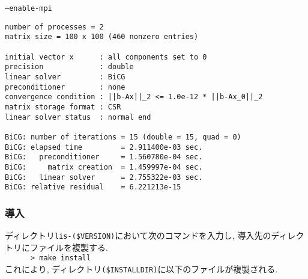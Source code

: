 \documentclass[a4paper]{jarticle}
\begin{document}
\begin{itembox}[l] {\tt --enable-mpi}
 \begin{minipage}{10cm}
 \begin{verbatim}
number of processes = 2
matrix size = 100 x 100 (460 nonzero entries)

initial vector x      : all components set to 0
precision             : double
linear solver         : BiCG
preconditioner        : none
convergence condition : ||b-Ax||_2 <= 1.0e-12 * ||b-Ax_0||_2
matrix storage format : CSR
linear solver status  : normal end

BiCG: number of iterations = 15 (double = 15, quad = 0)
BiCG: elapsed time         = 2.911400e-03 sec.
BiCG:   preconditioner     = 1.560780e-04 sec.
BiCG:     matrix creation  = 1.459997e-04 sec.
BiCG:   linear solver      = 2.755322e-03 sec.
BiCG: relative residual    = 6.221213e-15
\end{verbatim}
\end{minipage}
\end{itembox}

\subsubsection{導入}
ディレクトリ{\tt lis-(\$VERSION)}において次のコマンドを入力し, 導入先のディレクトリにファイルを複製する.\\
 \verb+      > make install+\\ 
これにより, ディレクトリ{\tt (\$INSTALLDIR)}に以下のファイルが複製される.
\end{document}
